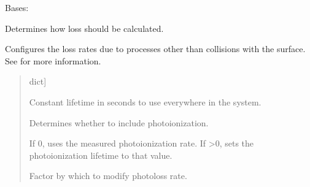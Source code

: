 \documentclass[letterpaper,10pt,english]{sphinxmanual}
\begin{document}
\begin{fulllineitems}
\label{\detokenize{nexoclom2/nexoclom2.initial_state.LossInformation:nexoclom2.initial_state.LossInformation.LossInformation}}
\pysigstartsignatures
\pysiglinewithargsret
{}
{\sphinxparamcomma {}\sphinxparamcomma {}\sphinxparamcomma {}}
{}
\pysigstopsignatures
\sphinxAtStartPar
Bases: {\hyperref[\detokenize{nexoclom2/nexoclom2.initial_state.InputClass:nexoclom2.initial_state.InputClass.InputClass}]{}}

\sphinxAtStartPar
Determines how loss should be calculated.

\sphinxAtStartPar
Configures the loss rates due to processes other than collisions with the
surface. See {\hyperref[\detokenize{nexoclom2/inputfiles:lossinfo}]{}} for more information.
\begin{quote}\begin{description}
\begin{description}
\sphinxlineitem{\sphinxstylestrong{lparam}}{[}dict{]}
\end{description}

\begin{description}
\sphinxAtStartPar
Constant lifetime in seconds to use everywhere in the system.

\sphinxAtStartPar
Determines whether to include photoionization.

\sphinxAtStartPar
If 0, uses the measured photoionization rate. If \textgreater{}0, sets the
photoionization lifetime to that value.

\sphinxAtStartPar
Factor by which to modify photo\sphinxhyphen{}loss rate.


\end{description}
\end{description}
\end{quote}
\end{fulllineitems}
\end{document}
